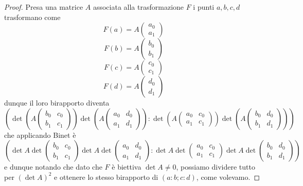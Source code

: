 \documentclass[11pt]{scrartcl}
\begin{document}
   	 \begin{proof}
   	 	Presa una matrice $A$ associata alla trasformazione $F$ i punti $a,b,c,d$ trasformano come
   	 	$$F(a)=A\begin{pmatrix}
   	 		a_0 \\
   	 		a_1
   	 	\end{pmatrix}$$
   	 	$$F(b)=A\begin{pmatrix}
   	 		b_0 \\
   	 		b_1
   	 	\end{pmatrix}$$
   	 	$$F(c)=A\begin{pmatrix}
   	 		c_0 \\
   	 		c_1
   	 	\end{pmatrix}$$
   	 	$$F(d)=A\begin{pmatrix}
   	 		d_0 \\
   	 		d_1
   	 	\end{pmatrix}$$
   	 	dunque il loro birapporto diventa
   	 	$$\left(\det \left(A\begin{pmatrix}
   	 		b_0 & c_0 \\
   	 		b_1 & c_1
   	 	\end{pmatrix}\right)\det \left(A
   	 	\begin{pmatrix}
   	 		a_0 & d_0 \\
   	 		a_1 & d_1
   	 	\end{pmatrix}\right):\det \left(A
   	 	\begin{pmatrix}
   	 		a_0 & c_0 \\
   	 		a_1 & c_1
   	 	\end{pmatrix}\right)\det \left(A
   	 	\begin{pmatrix}
   	 		b_0 & d_0 \\
   	 		b_1 & d_1
   	 	\end{pmatrix}\right)
   	 	\right)$$
   	 	che applicando Binet è
   	 	$$\left(\det A\det\begin{pmatrix}
   	 		b_0 & c_0 \\
   	 		b_1 & c_1
   	 	\end{pmatrix}\det A\det
   	 	\begin{pmatrix}
   	 		a_0 & d_0 \\
   	 		a_1 & d_1
   	 	\end{pmatrix}:\det A\det
   	 	\begin{pmatrix}
   	 		a_0 & c_0 \\
   	 		a_1 & c_1
   	 	\end{pmatrix}\det A\det
   	 	\begin{pmatrix}
   	 		b_0 & d_0 \\
   	 		b_1 & d_1
   	 	\end{pmatrix}
   	 	\right)$$
   	 	e dunque notando che dato che $F$ è biettiva $\det A\ne 0$, possiamo dividere tutto per $\left(\det A\right)^2$ e ottenere lo stesso birapporto di $(a:b;c:d)$, come volevamo.
   	 \end{proof}
\end{document}
